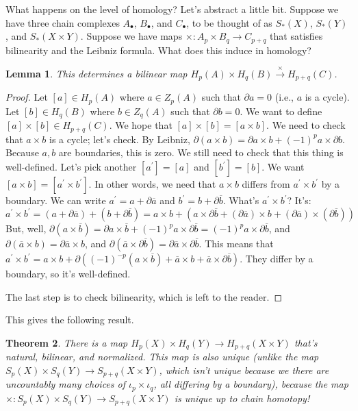 \documentclass{amsart}
\theoremstyle{theorem}
\newtheorem{theorem}{Theorem}[section]
\newtheorem{lemma}[theorem]{Lemma}
\theoremstyle{definition}
\begin{document}
What happens on the level of homology? Let's abstract a little bit. Suppose we have three chain complexes $A_\bullet$, $B_\bullet$, and $C_\bullet$, to be thought of as $S_\ast(X)$, $S_\ast(Y)$, and $S_\ast(X\times Y)$. Suppose we have maps $\times: A_p\times B_q\to C_{p+q}$ that satisfies bilinearity and the Leibniz formula. What does this induce in homology?
\begin{lemma}
This determines a bilinear map $ H_p(A)\times H_q(B)\xrightarrow{\times} H_{p+q}(C)$.
\end{lemma}
\begin{proof}
Let $[a]\in H_p(A)$ where $a\in Z_p(A)$ such that $\partial a=0$ (i.e., $a$ is a cycle). Let $[b]\in H_q(B)$ where $b\in Z_q(A)$ such that $\partial b=0$. We want to define $[a]\times [b]\in H_{p+q}(C)$. We hope that $[a]\times [b]=[a\times b]$. We need to check that $a\times b$ is a cycle; let's check. By Leibniz, $\partial(a\times b)=\partial a\times b+(-1)^pa\times\partial b$. Because $a,b$ are boundaries, this is zero. We still need to check that this thing is well-defined. Let's pick another $[a^\prime]=[a]$ and $[b^\prime]=[b]$. We want $[a\times b]=[a^\prime\times b^\prime]$. In other words, we need that $a\times b$ differs from $a^\prime\times b^\prime$ by a boundary. We can write $a^\prime=a+\partial\overline{a}$ and $b^\prime=b+\partial\overline{b}$. What's $a^\prime\times b^\prime$? It's:
	\begin{equation*}
	a^\prime\times b^\prime=(a+\partial\overline{a})+(b+\partial\overline{b})
	= a\times b+\left(a\times\partial\overline{b} + (\partial\overline{a})\times b+(\partial\overline{a})\times(\partial\overline{b})\right)
	\end{equation*}
But, well, $\partial(a\times\overline{b})=\partial a\times\overline{b}+(-1)^pa\times\partial\overline{b}=(-1)^pa\times\partial\overline{b}$, and $\partial(\overline{a}\times b)=\partial\overline{a}\times b$, and $\partial(\overline{a}\times\partial\overline{b})=\partial\overline{a}\times\partial\overline{b}$. This means that $a^\prime\times b^\prime=a\times b+\partial((-1)^{-p}(a\times \overline{b}) + \overline{a}\times b + \overline{a}\times\partial\overline{b})$. They differ by a boundary, so it's well-defined.

The last step is to check bilinearity, which is left to the reader.
\end{proof}
This gives the following result.
\begin{theorem}
There is a map $ H_p(X)\times H_q(Y)\to H_{p+q}(X\times Y)$ that's natural, bilinear, and normalized. This map is also \emph{unique} (unlike the map $S_p(X)\times S_q(Y)\to S_{p+q}(X\times Y)$, which isn't unique because we there are uncountably many choices of $\iota_p\times\iota_q$, all differing by a boundary), because the map $\times:S_p(X)\times S_q(Y)\to S_{p+q}(X\times Y)$ is unique up to chain homotopy!
\end{theorem}
\end{document}
